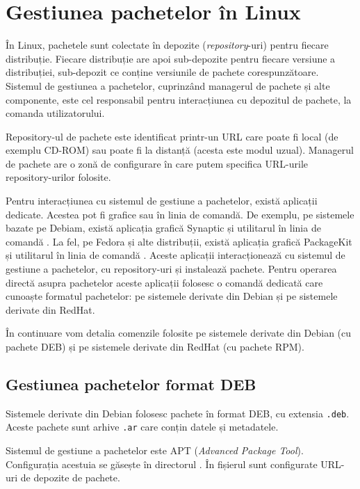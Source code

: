 \section{Gestiunea pachetelor în Linux}
\label{sec:package:linux}

În Linux, pachetele sunt colectate în depozite (\textit{repository}-uri) pentru fiecare distribuție. Fiecare distribuție are apoi sub-depozite pentru fiecare versiune a distribuției, sub-depozit ce conține versiunile de pachete corespunzătoare. Sistemul de gestiunea a pachetelor, cuprinzând managerul de pachete și alte componente, este cel responsabil pentru interacțiunea cu depozitul de pachete, la comanda utilizatorului.

Repository-ul de pachete este identificat printr-un URL care poate fi local (de exemplu CD-ROM) sau poate fi la distanță (acesta este modul uzual). Managerul de pachete are o zonă de configurare în care putem specifica URL-urile repository-urilor folosite.

Pentru interacțiunea cu sistemul de gestiune a pachetelor, există aplicații dedicate. Acestea pot fi grafice sau în linia de comandă. De exemplu, pe sistemele bazate pe Debiam, există aplicația grafică Synaptic și utilitarul în linia de comandă . La fel, pe Fedora și alte distribuții, există aplicația grafică PackageKit și utilitarul în linia de comandă . Aceste aplicații interacționează cu sistemul de gestiune a pachetelor, cu repository-uri și instalează pachete. Pentru operarea directă asupra pachetelor aceste aplicații folosesc o comandă dedicată care cunoaște formatul pachetelor:  pe sistemele derivate din Debian și  pe sistemele derivate din RedHat.

În continuare vom detalia comenzile folosite pe sistemele derivate din Debian (cu pachete DEB) și pe sistemele derivate din RedHat (cu pachete RPM).

\subsection{Gestiunea pachetelor format DEB}
\label{sec:package:deb}

Sistemele derivate din Debian folosesc pachete în format DEB, cu extensia \texttt{.deb}. Aceste pachete sunt arhive \texttt{.ar} care conțin datele și metadatele.

Sistemul de gestiune a pachetelor este APT (\textit{Advanced Package Tool}). Configurația acestuia se găsește în directorul . În fișierul  sunt configurate URL-uri de depozite de pachete.

